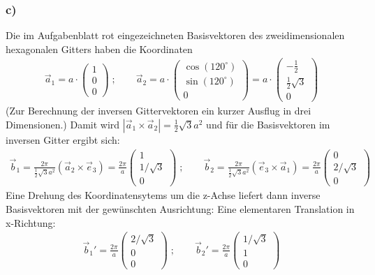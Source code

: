 \subsubsection*{c)}
Die im Aufgabenblatt rot eingezeichneten Basisvektoren des zweidimensionalen
hexagonalen Gitters haben die Koordinaten
\begin{align*}
  \vec a_1 = a \cdot \begin{pmatrix} 1 \\ 0 \\ 0 \end{pmatrix} \;; \qquad
  \vec a_2 = a \cdot \begin{pmatrix} \cos(120^\circ)\\ \sin(120^\circ)\\ 0\end{pmatrix} =
  a \cdot \begin{pmatrix} -\frac{1}{2}\\\frac{1}{2} \sqrt{3}\\ 0 \end{pmatrix}
\end{align*}
(Zur Berechnung der inversen Gittervektoren ein kurzer Ausflug in drei Dimensionen.)
Damit wird $ | \vec a_1 \times \vec a_2 | = \frac{1}{2} \sqrt{3} a^2$ und für die
Basisvektoren im inversen Gitter ergibt sich:
\begin{align*}
\vec b_1 =  \frac{2 \pi}{\frac{1}{2} \sqrt{3} a^2} (\vec a_2 \times \vec e_3 ) =
  \frac{2 \pi}{a} \begin{pmatrix} 1 \\ 1 / \sqrt{3} \\ 0 \end{pmatrix} \;; \qquad
  \vec b_2 =  \frac{2 \pi}{\frac{1}{2} \sqrt{3} a^2} (\vec e_3 \times \vec a_1) =
  \frac{2 \pi}{a} \begin{pmatrix} 0 \\ 2 / \sqrt{3} \\ 0 \end{pmatrix}
\end{align*}
Eine Drehung des Koordinatensytems um die z-Achse liefert dann inverse Basisvektoren
mit der gewünschten Ausrichtung: Eine elementaren Translation in x-Richtung:
\begin{align*}
  \vec b_1' = \frac{2 \pi}{a} \begin{pmatrix} 2 / \sqrt{3} \\ 0 \\ 0 \end{pmatrix}  \;; \qquad
  \vec b_2' =  \frac{2 \pi}{a} \begin{pmatrix} 1  / \sqrt{3} \\ 1\\ 0 \end{pmatrix}
\end{align*}
